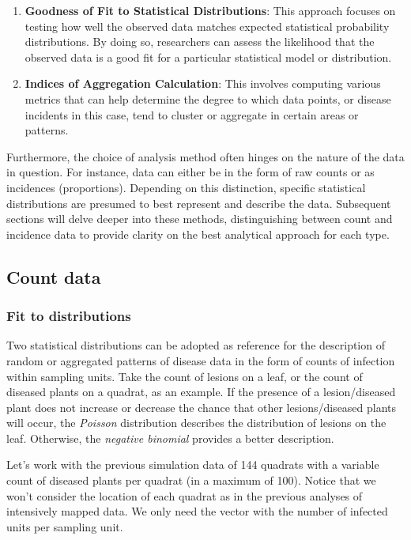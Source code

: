 \documentclass[
  letterpaper,
]{book}
\begin{document}
\begin{enumerate}
\def\labelenumi{\arabic{enumi}.}
\item
  \textbf{Goodness of Fit to Statistical Distributions}: This approach
  focuses on testing how well the observed data matches expected
  statistical probability distributions. By doing so, researchers can
  assess the likelihood that the observed data is a good fit for a
  particular statistical model or distribution.
\item
  \textbf{Indices of Aggregation Calculation}: This involves computing
  various metrics that can help determine the degree to which data
  points, or disease incidents in this case, tend to cluster or
  aggregate in certain areas or patterns.
\end{enumerate}

Furthermore, the choice of analysis method often hinges on the nature of
the data in question. For instance, data can either be in the form of
raw counts or as incidences (proportions). Depending on this
distinction, specific statistical distributions are presumed to best
represent and describe the data. Subsequent sections will delve deeper
into these methods, distinguishing between count and incidence data to
provide clarity on the best analytical approach for each type.

\hypertarget{count-data}{%
\subsection{Count data}\label{count-data}}

\hypertarget{fit-to-distributions}{%
\subsubsection{Fit to distributions}\label{fit-to-distributions}}

Two statistical distributions can be adopted as reference for the
description of random or aggregated patterns of disease data in the form
of counts of infection within sampling units. Take the count of lesions
on a leaf, or the count of diseased plants on a quadrat, as an example.
If the presence of a lesion/diseased plant does not increase or decrease
the chance that other lesions/diseased plants will occur, the
\emph{Poisson} distribution describes the distribution of lesions on the
leaf. Otherwise, the \emph{negative binomial} provides a better
description.

Let's work with the previous simulation data of 144 quadrats with a
variable count of diseased plants per quadrat (in a maximum of 100).
Notice that we won't consider the location of each quadrat as in the
previous analyses of intensively mapped data. We only need the vector
with the number of infected units per sampling unit.
\end{document}
